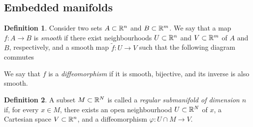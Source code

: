 \documentclass[11pt,a4paper]{book}
\newtheorem{thm}{Theorem}[section]
\newtheorem{corol}[thm]{Corollary}
\theoremstyle{remark} \newtheorem{rmk}[thm]{Remark}
\theoremstyle{definition} \newtheorem{defn}[thm]{Definition}
\theoremstyle{definition} \newtheorem{ex}[thm]{Example}
\theoremstyle{definition} \newtheorem{ej}[thm]{Exercise}
\begin{document}
%
%
\subsection{Embedded manifolds}
\begin{defn}
  Consider two sets $A\subset \mathbb R^n$ and $B\subset \mathbb R^m$. We say that a map $f:A\rightarrow B$ is \emph{smooth} if there exist neighbourhoods $U\subset \mathbb R^n$ and $V\subset \mathbb R^m$ of $A$ and $B$, respectively, and a smooth map $\tilde{f}:U\rightarrow V$ such that the following diagram commutes
  \begin{center}
  \end{center}
  We say that $f$ is a \emph{diffeomorphism} if it is smooth, bijective, and its inverse is also smooth.
\end{defn}

\begin{defn}
A subset $M\subset \mathbb R^N$ is called a \emph{regular submanifold of dimension $n$} if, for every $x\in M$, there exists an open neighbourhood $U\subset \mathbb R^N$ of $x$, a Cartesian space $V\subset \mathbb R^n$, and a diffeomorphism $\varphi:U\cap M \rightarrow V$.
\end{defn}
\end{document}
